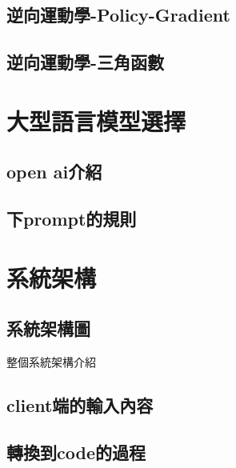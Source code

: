 \documentclass[class=NCU_thesis, crop=false]{standalone}
\begin{document}
\subsection{逆向運動學-Policy-Gradient}
\subsection{逆向運動學-三角函數}

\section{大型語言模型選擇}
\subsection{open ai介紹}
\subsection{下prompt的規則}

\section{系統架構}
\subsection{系統架構圖}
整個系統架構介紹
\subsection{client端的輸入內容}
\subsection{轉換到code的過程}
\end{document}
